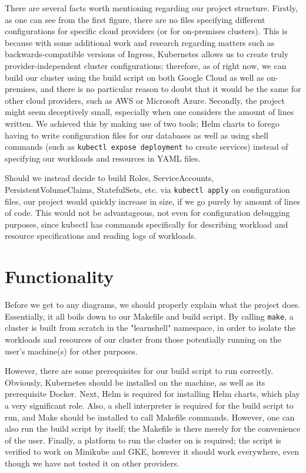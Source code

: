 \documentclass[thesis=B,english]{FITthesis}[2019/12/23]
\begin{document}
There are several facts worth mentioning regarding our project structure. Firstly, as one can see from the first figure, there are no files specifying different configurations for specific cloud providers (or for on-premises clusters). This is because with some additional work and research regarding matters such as backwards-compatible versions of Ingress, Kubernetes allows us to create truly provider-independent cluster configurations; therefore, as of right now, we can build our cluster using the build script on both Google Cloud as well as on-premises, and there is no particular reason to doubt that it would be the same for other cloud providers, such as AWS or Microsoft Azure. Secondly, the project might seem deceptively small, especially when one considers the amount of lines written. We achieved this by making use of two tools; Helm charts to forego having to write configuration files for our databases as well as using shell commands (such as \verb|kubectl expose deployment| to create services) instead of specifying our workloads and resources in YAML files. 

Should we instead decide to build Roles, ServiceAccounts, PersistentVolumeClaims, StatefulSets, etc. via \verb|kubectl apply| on configuration files, our project would quickly increase in size, if we go purely by amount of lines of code. This would not be advantageous, not even for configuration debugging purposes, since kubectl has commands specifically for describing workload and resource specifications and reading logs of workloads.

\section{Functionality}

Before we get to any diagrams, we should properly explain what the project does. Essentially, it all boils down to our Makefile and build script. By calling \verb|make|, a cluster is built from scratch in the "learnshell" namespace, in order to isolate the workloads and resources of our cluster from those potentially running on the user's machine(s) for other purposes. 

However, there are some prerequisites for our build script to run correctly. Obviously, Kubernetes should be installed on the machine, as well as its prerequisite Docker. Next, Helm is required for installing Helm charts, which play a very significant role. Also, a shell interpreter is required for the build script to run, and Make should be installed to call Makefile commands. However, one can also run the build script by itself; the Makefile is there merely for the convenience of the user. Finally, a platform to run the cluster on is required; the script is verified to work on Minikube and GKE, however it should work everywhere, even though we have not tested it on other providers.
\end{document}
